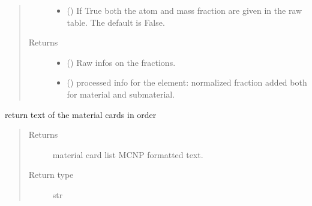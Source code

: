 \documentclass[letterpaper,10pt,english]{sphinxmanual}
\begin{document}
\begin{fulllineitems}
\begin{fulllineitems}
\begin{quote}
\begin{description}
\begin{itemize}
\item {} 
\sphinxAtStartPar
{} (\sphinxstyleliteralemphasis{\sphinxupquote{, }}) \textendash{} If True both the atom and mass fraction are given in the raw
table. The default is False.

\end{itemize}

\item[{Returns}] \leavevmode
\sphinxAtStartPar
\begin{itemize}
\item {} 
\sphinxAtStartPar
{} () \textendash{} Raw infos on the fractions.

\item {} 
\sphinxAtStartPar
{} () \textendash{} processed info for the element: normalized fraction added both for
material and submaterial.

\end{itemize}


\end{description}\end{quote}

\end{fulllineitems}


\begin{fulllineitems}
\label{\detokenize{api/inputgeneration:matreader.MatCardsList.to_text}}
\sphinxAtStartPar
return text of the material cards in order
\begin{quote}\begin{description}
\item[{Returns}] \leavevmode
\sphinxAtStartPar
material card list MCNP formatted text.

\item[{Return type}] \leavevmode
\sphinxAtStartPar
str

\end{description}\end{quote}

\end{fulllineitems}



\end{fulllineitems}
\end{document}
